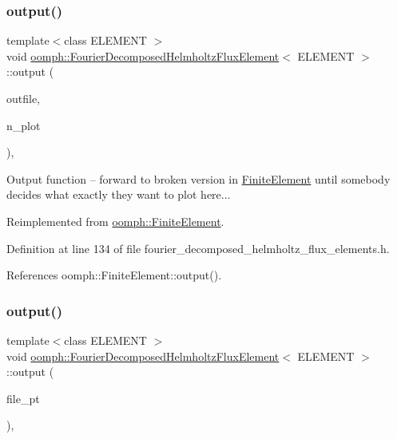 \subsubsection{\texorpdfstring{output()}{output()}\hspace{0.1cm}{\footnotesize\ttfamily [2/4]}}
{\footnotesize\ttfamily template$<$class E\+L\+E\+M\+E\+NT $>$ \\
void \hyperlink{classoomph_1_1FourierDecomposedHelmholtzFluxElement}{oomph\+::\+Fourier\+Decomposed\+Helmholtz\+Flux\+Element}$<$ E\+L\+E\+M\+E\+NT $>$\+::output (\begin{DoxyParamCaption}\item[{std\+::ostream \&}]{outfile,  }\item[{const unsigned \&}]{n\+\_\+plot }\end{DoxyParamCaption})\hspace{0.3cm}{\ttfamily [inline]}, {\ttfamily [virtual]}}



Output function -- forward to broken version in \hyperlink{classoomph_1_1FiniteElement}{Finite\+Element} until somebody decides what exactly they want to plot here... 



Reimplemented from \hyperlink{classoomph_1_1FiniteElement_afa9d9b2670f999b43e6679c9dd28c457}{oomph\+::\+Finite\+Element}.



Definition at line 134 of file fourier\+\_\+decomposed\+\_\+helmholtz\+\_\+flux\+\_\+elements.\+h.



References oomph\+::\+Finite\+Element\+::output().

\mbox{\label{classoomph_1_1FourierDecomposedHelmholtzFluxElement_a08316af2339948cb05b4a8a3875c3dfc}} 
\subsubsection{\texorpdfstring{output()}{output()}\hspace{0.1cm}{\footnotesize\ttfamily [3/4]}}
{\footnotesize\ttfamily template$<$class E\+L\+E\+M\+E\+NT $>$ \\
void \hyperlink{classoomph_1_1FourierDecomposedHelmholtzFluxElement}{oomph\+::\+Fourier\+Decomposed\+Helmholtz\+Flux\+Element}$<$ E\+L\+E\+M\+E\+NT $>$\+::output (\begin{DoxyParamCaption}\item[{F\+I\+LE $\ast$}]{file\+\_\+pt }\end{DoxyParamCaption})\hspace{0.3cm}{\ttfamily [inline]}, {\ttfamily [virtual]}}

